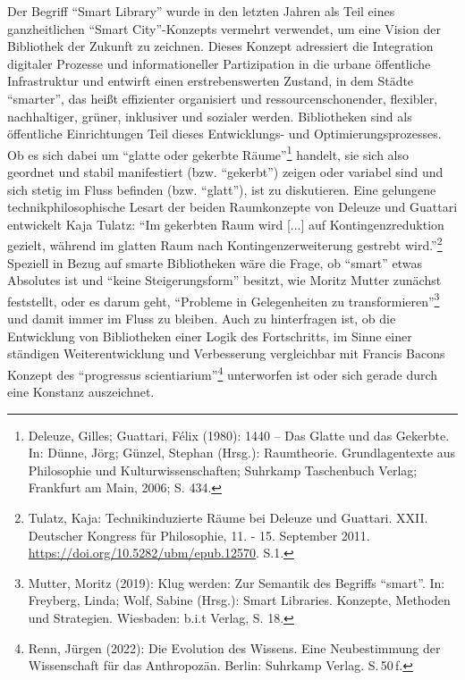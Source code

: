 \documentclass[a4paper,
fontsize=11pt,
oneside,
numbers=noperiodatend,
parskip=half-,
bibliography=totoc,
final
]{scrartcl}
\begin{document}
Der Begriff \enquote{Smart Library} wurde in den letzten Jahren als Teil
eines ganzheitlichen \enquote{Smart City}-Konzepts vermehrt verwendet,
um eine Vision der Bibliothek der Zukunft zu zeichnen. Dieses Konzept
adressiert die Integration digitaler Prozesse und informationeller
Partizipation in die urbane öffentliche Infrastruktur und entwirft einen
erstrebenswerten Zustand, in dem Städte \enquote{smarter}, das heißt
effizienter organisiert und ressourcenschonender, flexibler,
nachhaltiger, grüner, inklusiver und sozialer werden. Bibliotheken sind
als öffentliche Einrichtungen Teil dieses Entwicklungs- und
Optimierungsprozesses. Ob es sich dabei um \enquote{glatte oder gekerbte
Räume}\footnote{Deleuze, Gilles; Guattari, Félix (1980): 1440 -- Das
  Glatte und das Gekerbte. In: Dünne, Jörg; Günzel, Stephan (Hrsg.):
  Raumtheorie. Grundlagentexte aus Philosophie und Kulturwissenschaften;
  Suhrkamp Taschenbuch Verlag; Frankfurt am Main, 2006; S. 434.}
handelt, sie sich also geordnet und stabil manifestiert (bzw.
\enquote{gekerbt}) zeigen oder variabel sind und sich stetig im Fluss
befinden (bzw. \enquote{glatt}), ist zu diskutieren. Eine gelungene
technikphilosophische Lesart der beiden Raumkonzepte von Deleuze und
Guattari entwickelt Kaja Tulatz: \enquote{Im gekerbten Raum wird
{[}...{]} auf Kontingenzreduktion gezielt, während im glatten Raum nach
Kontingenzerweiterung gestrebt wird.}\footnote{Tulatz, Kaja:
  Technikinduzierte Räume bei Deleuze und Guattari. XXII. Deutscher
  Kongress für Philosophie, 11. - 15. September 2011.
  \url{https://doi.org/10.5282/ubm/epub.12570}. S.1.} Speziell in Bezug
auf smarte Bibliotheken wäre die Frage, ob \enquote{smart} etwas
Absolutes ist und \enquote{keine Steigerungsform} besitzt, wie Moritz
Mutter zunächst feststellt, oder es darum geht, \enquote{Probleme in
Gelegenheiten zu transformieren}\footnote{Mutter, Moritz (2019): Klug
  werden: Zur Semantik des Begriffs \enquote{smart}. In: Freyberg,
  Linda; Wolf, Sabine (Hrsg.): Smart Libraries. Konzepte, Methoden und
  Strategien. Wiesbaden: b.i.t Verlag, S. 18.} und damit immer im Fluss
zu bleiben. Auch zu hinterfragen ist, ob die Entwicklung von
Bibliotheken einer Logik des Fortschritts, im Sinne einer ständigen
Weiterentwicklung und Verbesserung vergleichbar mit Francis Bacons
Konzept des \enquote{progressus scientiarium}\footnote{Renn, Jürgen
  (2022): Die Evolution des Wissens. Eine Neubestimmung der Wissenschaft
  für das Anthropozän. Berlin: Suhrkamp Verlag. S.\,50\,f.} unterworfen
ist oder sich gerade durch eine Konstanz auszeichnet.
\end{document}
